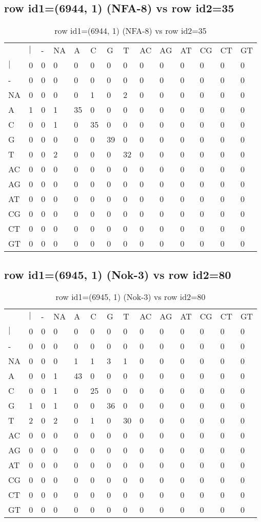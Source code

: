 \subsection{row id1=(6944, 1) (NFA-8) vs row id2=35}
\begin{center}
\begin{longtable}{|l|l|l|l|l|l|l|l|l|l|l|l|l|l|}
\caption{row id1=(6944, 1) (NFA-8) vs row id2=35} \label{table_dm148}\\
\hline
\\
\hline
&$|$&-&NA&A&C&G&T&AC&AG&AT&CG&CT&GT\\
$|$&0&0&0&0&0&0&0&0&0&0&0&0&0\\
-&0&0&0&0&0&0&0&0&0&0&0&0&0\\
NA&0&0&0&0&1&0&2&0&0&0&0&0&0\\
A&1&0&1&35&0&0&0&0&0&0&0&0&0\\
C&0&0&1&0&35&0&0&0&0&0&0&0&0\\
G&0&0&0&0&0&39&0&0&0&0&0&0&0\\
T&0&0&2&0&0&0&32&0&0&0&0&0&0\\
AC&0&0&0&0&0&0&0&0&0&0&0&0&0\\
AG&0&0&0&0&0&0&0&0&0&0&0&0&0\\
AT&0&0&0&0&0&0&0&0&0&0&0&0&0\\
CG&0&0&0&0&0&0&0&0&0&0&0&0&0\\
CT&0&0&0&0&0&0&0&0&0&0&0&0&0\\
GT&0&0&0&0&0&0&0&0&0&0&0&0&0\\
\hline
\end{longtable}
\end{center}

\subsection{row id1=(6945, 1) (Nok-3) vs row id2=80}
\begin{center}
\begin{longtable}{|l|l|l|l|l|l|l|l|l|l|l|l|l|l|}
\caption{row id1=(6945, 1) (Nok-3) vs row id2=80} \label{table_dm150}\\
\hline
\\
\hline
&$|$&-&NA&A&C&G&T&AC&AG&AT&CG&CT&GT\\
$|$&0&0&0&0&0&0&0&0&0&0&0&0&0\\
-&0&0&0&0&0&0&0&0&0&0&0&0&0\\
NA&0&0&0&1&1&3&1&0&0&0&0&0&0\\
A&0&0&1&43&0&0&0&0&0&0&0&0&0\\
C&0&0&1&0&25&0&0&0&0&0&0&0&0\\
G&1&0&1&0&0&36&0&0&0&0&0&0&0\\
T&2&0&2&0&1&0&30&0&0&0&0&0&0\\
AC&0&0&0&0&0&0&0&0&0&0&0&0&0\\
AG&0&0&0&0&0&0&0&0&0&0&0&0&0\\
AT&0&0&0&0&0&0&0&0&0&0&0&0&0\\
CG&0&0&0&0&0&0&0&0&0&0&0&0&0\\
CT&0&0&0&0&0&0&0&0&0&0&0&0&0\\
GT&0&0&0&0&0&0&0&0&0&0&0&0&0\\
\hline
\end{longtable}
\end{center}

